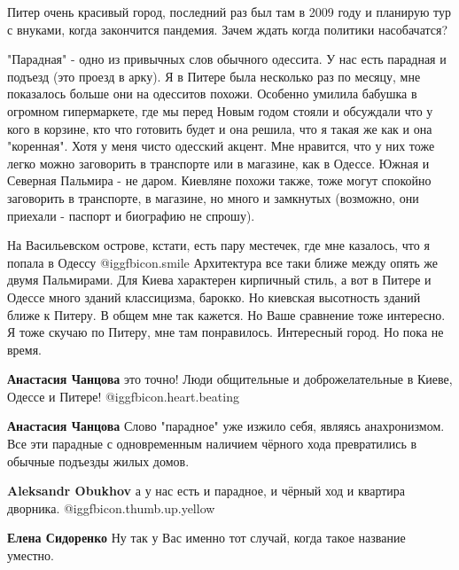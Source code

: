 \begin{itemize}

Питер очень красивый город, последний раз был там в 2009 году и планирую тур с
внуками, когда закончится пандемия. Зачем ждать когда политики насобачатся?


"Парадная" - одно из привычных слов обычного одессита. У нас есть парадная и
подъезд (это проезд в арку). Я в Питере была несколько раз по месяцу, мне
показалось больше они на одесситов похожи. Особенно умилила бабушка в огромном
гипермаркете, где мы перед Новым годом стояли и обсуждали что у кого в корзине,
кто что готовить будет и она решила, что я такая же как и она "коренная". Хотя
у меня чисто одесский акцент. Мне нравится, что у них тоже легко можно
заговорить в транспорте или в магазине, как в Одессе. Южная и Северная Пальмира
- не даром. Киевляне похожи также, тоже могут спокойно заговорить в транспорте,
в магазине, но много и замкнутых (возможно, они приехали - паспорт и биографию
не спрошу). 

На Васильевском острове, кстати, есть пару местечек, где мне казалось, что я
попала в Одессу  @igg{fbicon.smile}  Архитектура все таки ближе между опять же
двумя Пальмирами.  Для Киева характерен кирпичный стиль, а вот в Питере и
Одессе много зданий классицизма, барокко. Но киевская высотность зданий ближе к
Питеру. В общем мне так кажется. Но Ваше сравнение тоже интересно.  Я тоже
скучаю по Питеру, мне там понравилось. Интересный город. Но пока не время.

\begin{itemize} %
\textbf{Анастасия Чанцова} это точно! Люди общительные и доброжелательные в Киеве, Одессе и Питере! @igg{fbicon.heart.beating} 

\textbf{Анастасия Чанцова}
Слово "парадное" уже изжило себя, являясь анахронизмом.
Все эти парадные с одновременным наличием чёрного хода превратились в обычные подъезды жилых домов.

\begin{itemize} %
\textbf{Aleksandr Obukhov} а у нас есть и парадное, и чёрный ход и квартира дворника. @igg{fbicon.thumb.up.yellow} 

\textbf{Елена Сидоренко}
Ну так у Вас именно тот случай, когда такое название уместно.
\end{itemize} %

\end{itemize} %


\end{itemize}
